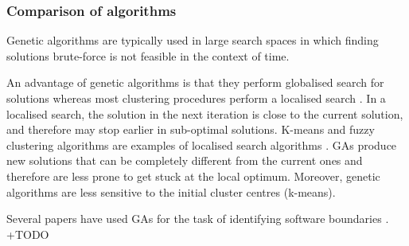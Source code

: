 
\subsubsection{Comparison of algorithms}
Genetic algorithms are typically used in large search spaces in which finding solutions brute-force is not feasible in the context of time. 

An advantage of genetic algorithms is that they perform globalised search for solutions whereas most clustering procedures perform a localised search \cite{rokach2005clustering}. In a localised search, the solution in the next iteration is close to the current solution, and therefore may stop earlier in sub-optimal solutions. K-means and fuzzy clustering algorithms are examples of localised search algorithms \cite{rokach2005clustering}. GAs produce new solutions that can be completely different from the current ones and therefore are less prone to get stuck at the local optimum.
Moreover, genetic algorithms are less sensitive to the initial cluster centres (k-means).

Several papers have used GAs for the task of identifying software boundaries \cite{saeidi2015search} \cite{Doval1999} \cite{saidani2019towards} \cite{zhang2020automated}. 
+TODO





